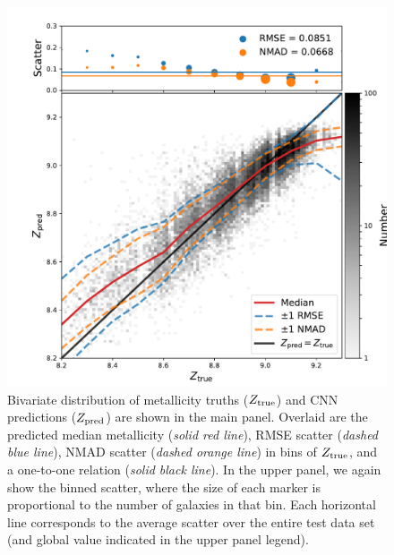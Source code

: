 \documentclass[fleqn,usenatbib]{mnras}
\begin{document}
\begin{figure}
	\includegraphics[width=\columnwidth]{02-prediction_128_summary.pdf}
	\caption{\label{fig:predicting-metallicity}
		Bivariate distribution of metallicity truths ($Z_{\rm true}$) and CNN predictions ($Z_{\rm pred}$) are shown in the main panel.
		Overlaid are the predicted median metallicity (\textit{solid red line}), RMSE scatter (\textit{dashed blue line}), NMAD scatter (\textit{dashed orange line}) in bins of $Z_{\rm true}$, and a one-to-one relation (\textit{solid black line}).
		In the upper panel, we again show the binned scatter, where the size of each marker is proportional to the number of galaxies in that bin.
		Each horizontal line corresponds to the average scatter over the entire test data set (and global value indicated in the upper panel legend).
		}
\end{figure}



%
\end{document}
